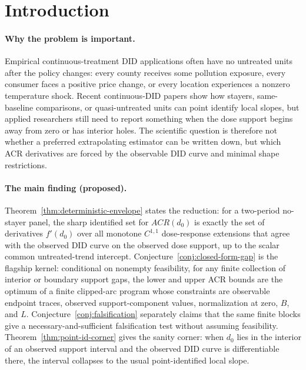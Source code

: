 \documentclass[11pt]{article}
\theoremstyle{definition}
\theoremstyle{plain}
\theoremstyle{remark}
\begin{document}
\section{Introduction}
\paragraph{Why the problem is important.}
Empirical continuous-treatment DID applications often have no untreated units after the policy changes: every county receives some pollution exposure, every consumer faces a positive price change, or every location experiences a nonzero temperature shock.  Recent continuous-DID papers show how stayers, same-baseline comparisons, or quasi-untreated units can point identify local slopes, but applied researchers still need to report something when the dose support begins away from zero or has interior holes.  The scientific question is therefore not whether a preferred extrapolating estimator can be written down, but which ACR derivatives are forced by the observable DID curve and minimal shape restrictions.

\paragraph{The main finding (proposed).}
Theorem~\ref{thm:deterministic-envelope} states the reduction: for a two-period no-stayer panel, the sharp identified set for \(ACR(d_0)\) is exactly the set of derivatives \(f'(d_0)\) over all monotone \(C^{1,1}\) dose-response extensions that agree with the observed DID curve on the observed dose support, up to the scalar common untreated-trend intercept.  Conjecture~\ref{conj:closed-form-gap} is the flagship kernel: conditional on nonempty feasibility, for any finite collection of interior or boundary support gaps, the lower and upper ACR bounds are the optimum of a finite clipped-arc program whose constraints are observable endpoint traces, observed support-component values, normalization at zero, \(B\), and \(L\).  Conjecture~\ref{conj:falsification} separately claims that the same finite blocks give a necessary-and-sufficient falsification test without assuming feasibility.  Theorem~\ref{thm:point-id-corner} gives the sanity corner: when \(d_0\) lies in the interior of an observed support interval and the observed DID curve is differentiable there, the interval collapses to the usual point-identified local slope.
\end{document}
